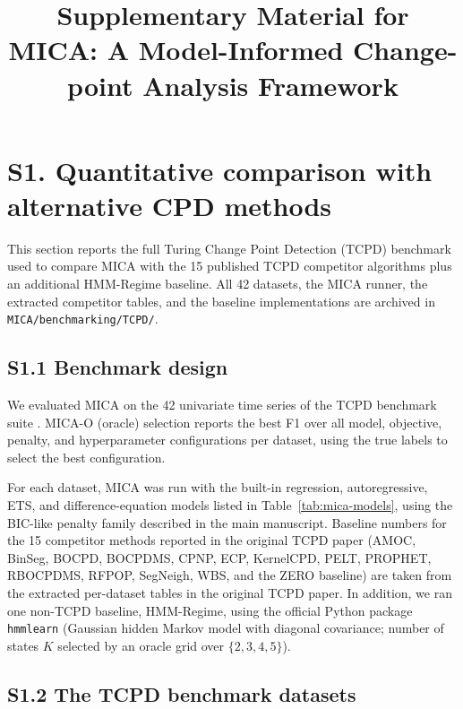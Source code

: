 \documentclass[11pt,a4paper]{article}
\title{Supplementary Material for \\ MICA: A Model-Informed Change-point Analysis Framework}
\author{}
\date{}
\begin{document}
\maketitle

\section*{S1. Quantitative comparison with alternative CPD methods}

This section reports the full Turing Change Point Detection (TCPD) benchmark used to compare MICA with the 15 published TCPD competitor algorithms plus an additional HMM-Regime baseline. All 42 datasets, the MICA runner, the extracted competitor tables, and the baseline implementations are archived in \texttt{MICA/benchmarking/TCPD/}.

\subsection*{S1.1 Benchmark design}

We evaluated MICA on the 42 univariate time series of the TCPD benchmark suite \cite{vandenburg2020evaluation}. MICA-O (oracle) selection reports the best F1 over all model, objective, penalty, and hyperparameter configurations per dataset, using the true labels to select the best configuration.

For each dataset, MICA was run with the built-in regression, autoregressive, ETS, and difference-equation models listed in Table~\ref{tab:mica-models}, using the BIC-like penalty family described in the main manuscript. Baseline numbers for the 15 competitor methods reported in the original TCPD paper (AMOC, BinSeg, BOCPD, BOCPDMS, CPNP, ECP, KernelCPD, PELT, PROPHET, RBOCPDMS, RFPOP, SegNeigh, WBS, and the ZERO baseline) are taken from the extracted per-dataset tables in the original TCPD paper. In addition, we ran one non-TCPD baseline, HMM-Regime, using the official Python package \texttt{hmmlearn} (Gaussian hidden Markov model with diagonal covariance; number of states $K$ selected by an oracle grid over $\{2,3,4,5\}$).

\clearpage



\subsection*{S1.2 The TCPD benchmark datasets}
\end{document}
